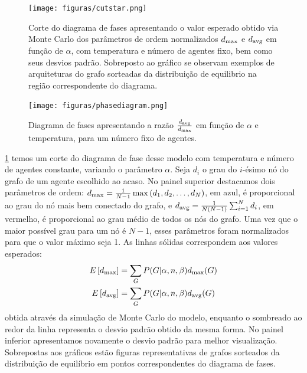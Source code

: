 \begin{figure}
  \texttt{[image: figuras/cutstar.png]}
  \caption[Corte do diagrama de fases apresentando o valor esperado dos parâmetros de ordem.]{Corte do diagrama de fases apresentando o valor esperado obtido via  Monte Carlo dos parâmetros de ordem normalizados $d_{\text{max}}$ e $d_{\text{avg}}$ em função de $\alpha$, com temperatura e número de agentes fixo, bem como seus desvios padrão. Sobreposto ao gráfico se observam exemplos de arquiteturas do grafo sorteadas da distribuição de equilibrio na região correspondente do diagrama. }
  \label{fig:cutstar}
\end{figure}
\begin{fullwidth}
\begin{figure}
	\texttt{[image: figuras/phasediagram.png]}
 	\caption{ Diagrama de fases apresentando a razão $\frac{d_{\text{avg}}}{d_{\text{max}}}$ em função de $\alpha$ e temperatura, para um número fixo de agentes.}
 	\label{fig:phasediagram}
\end{figure}
\end{fullwidth}
 \ref{fig:cutstar} temos um corte do diagrama de fase desse modelo com temperatura e número de agentes constante, variando o parâmetro $\alpha$. Seja $d_i$ o grau do $i$-ésimo nó do grafo de um agente escolhido ao acaso. No painel superior destacamos dois parâmetros de ordem: $d_{\text{max}} = \frac{1}{N-1}\max\left(d_1, d_2,\ldots, d_N\right)$, em azul, é proporcional ao grau do nó mais bem conectado do grafo, e $d_{\text{avg}} = \frac{1}{N(N-1)}\sum_{i=1}^N d_i$, em vermelho, é proporcional ao grau médio de todos os nós do grafo. Uma vez que o maior possível grau para um nó é $N-1$, esses parâmetros foram normalizados para que o valor máximo seja 1. As linhas sólidas correspondem aos valores esperados:
\begin{align}
E\left[d_{\text{max}}\right] &= \sum_{G} P(G | \alpha, n, \beta) d_{\text{max}}(G) \\
E\left[d_{\text{avg}}\right] &= \sum_{G} P(G | \alpha, n, \beta) d_{\text{avg}}(G)
\end{align}
obtida através da simulação de Monte Carlo do modelo, enquanto o sombreado ao redor da linha representa o desvio padrão obtido da mesma forma. No painel inferior apresentamos novamente o desvio padrão para melhor visualização. Sobrepostas aos gráficos estão figuras representativas de grafos sorteados da 
distribuição de equilíbrio em pontos correspondentes do diagrama de fases. 
